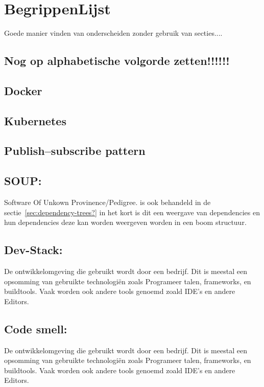 \usepackage{lipsum}%

\chapter{BegrippenLijst}\label{ch:begrippenlijst}




Goede manier vinden van onderscheiden zonder gebruik van secties....

\section*{Nog op alphabetische volgorde zetten!!!!!!}\label{sec:nog-op-alphabetische-volgorde-zetten!!!!!!}

\section{Docker}
\section{Kubernetes}
\section{Publish–subscribe pattern}
\lipsum[01]
\section{SOUP:}\label{sec:soup:} Software Of Unkown Provinence/Pedigree. is ook behandeld in de sectie~\ref{sec:dependency-trees?} in het kort is dit een weergave van dependencies en hun dependencies deze kan worden weergeven worden in een boom structuur.
\smallskip

\section{Dev-Stack:}\label{sec:dev-stack:} De ontwikkelomgeving die gebruikt wordt door een bedrijf. Dit is meestal een opsomming van gebruikte technologiën zoals Programeer talen, frameworks, en buildtools. Vaak worden ook andere tools genoemd zoald IDE's en andere Editors.
\smallskip

\section{Code smell:}\label{sec:code-smell:} De ontwikkelomgeving die gebruikt wordt door een bedrijf. Dit is meestal een opsomming van gebruikte technologiën zoals Programeer talen, frameworks, en buildtools. Vaak worden ook andere tools genoemd zoald IDE's en andere Editors.
\smallskip

